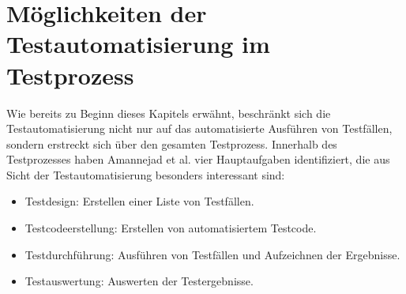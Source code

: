 \section{Möglichkeiten der Testautomatisierung im Testprozess}
\label{sec:bereiche_der_testautomatisierung}
Wie bereits zu Beginn dieses Kapitels erwähnt, beschränkt sich die Testautomatisierung nicht nur auf das automatisierte Ausführen von Testfällen, sondern erstreckt sich über den gesamten Testprozess. Innerhalb des Testprozesses haben Amannejad et al. \cite{amannejad_search-based_2014} vier Hauptaufgaben identifiziert, die aus Sicht der Testautomatisierung besonders interessant sind:

\begin{itemize}
\item Testdesign: Erstellen einer Liste von Testfällen.
\item Testcodeerstellung: Erstellen von automatisiertem Testcode.
\item Testdurchführung: Ausführen von Testfällen und Aufzeichnen der Ergebnisse.
\item Testauswertung: Auswerten der Testergebnisse.
\end{itemize}

